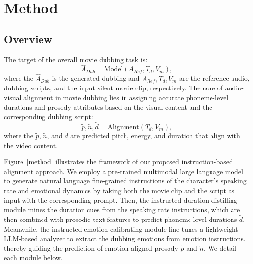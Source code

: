 \section{Method}

\subsection{Overview}
The target of the overall movie dubbing task is:
\begin{equation}
     \hat{A} _{Dub} = \mathrm{Model}(A_{Ref}, T_{d}, V_{m}),
\end{equation}
where the $\hat{A} _{Dub}$ is the generated dubbing and $A_{Ref}, T_{d}, V_{m}$ are the reference audio, dubbing scripts, and the input silent movie clip, respectively.
The core of audio-visual alignment in movie dubbing lies in assigning accurate phoneme-level durations and prosody attributes based on the visual content and the corresponding dubbing script:
\begin{equation}
     \tilde{p}, \tilde{n}, \tilde{d} = \mathrm{Alignment}(T_d,V_{m}),
\end{equation}
where the $\tilde{p}$, $\tilde{n}$, and $\tilde{d}$ are predicted pitch, energy, and duration that align with the video content.

Figure~\ref{method} illustrates the framework of our proposed instruction-based alignment approach.
We employ a pre-trained multimodal large language model to generate natural language fine-grained instructions of the character's speaking rate and emotional dynamics by taking both the movie clip and the script as input with the corresponding prompt.
Then, the instructed duration distilling module mines the duration cues from the speaking rate instructions, which are then combined with prosodic text features to predict phoneme-level durations $\tilde{d}$.
Meanwhile, the instructed emotion calibrating module fine-tunes a lightweight LLM-based analyzer to extract the dubbing emotions from emotion instructions, thereby guiding the prediction of emotion-aligned prosody $\tilde{p}$ and $\tilde{n}$.
We detail each module below.

